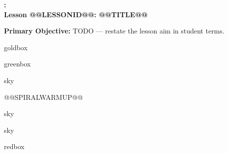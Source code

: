 \documentclass[10pt]{article}
\makeatletter
\newcommand{\LessonNumberName}{Lesson @@LESSONID@@: @@TITLE@@}
\makeatother
\begin{document}
\begin{center}
    {\Large\bfseries \CourseName: \SchoolYear \\
    {\small\bfseries \UnitNumberName \LessonNumberName}}
\end{center}

\begin{tcolorbox}[colback=sky, colframe=navy, boxrule=0.9pt, arc=2mm,
    left=2mm, right=2mm, top=1.5mm, bottom=1.5mm]
    \textbf{Primary Objective:} TODO --- restate the lesson aim in student terms.
\end{tcolorbox}

\renewcommand{\arraystretch}{1.6}
\begin{skillbox}{goldbox}
\end{skillbox}

\begin{skillbox}{greenbox}
\end{skillbox}

\begin{skillbox}{sky}
    \begin{minipage}[t]{0.48\linewidth}
    \end{minipage}
    \hfill
    \begin{minipage}[t]{0.48\linewidth}
@@SPIRALWARMUP@@
    \end{minipage}
\end{skillbox}

\begin{skillbox}[Hook]{sky}
\end{skillbox}

\begin{skillbox}[Lesson]{sky}
\end{skillbox}

\begin{skillbox}{redbox}
\end{skillbox}
\end{document}
